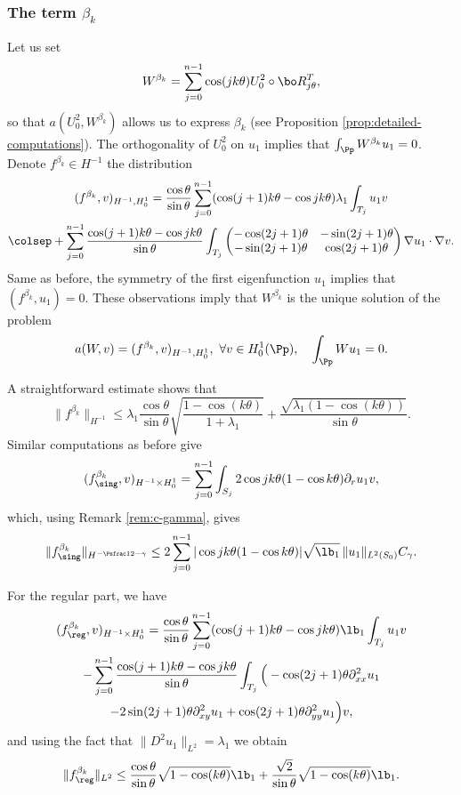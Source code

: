 \subsubsection*{The term $\beta_k$}
Let us set
\[
W^{\beta_k} = \sum_{j=0}^{n-1} \cos(jk\theta) U_0^2\circ \bo R_{j\theta}^T,
\]
so that $a(U_0^2,W^{\beta_k})$ allows us to express $\beta_k$ (see Proposition \ref{prop:detailed-computations}). The orthogonality of $U_0^2$ on $u_1$ implies that $\int_\Pp W^{\beta_k}u_1=0$. Denote $f^{\beta_k} \in H^{-1}$ the distribution
\vspace*{-5pt}
\begin{multline*}
(f^{\beta_k},v)_{H^{-1},H_0^1}
= \frac{\cos\theta}{\sin\theta}\sum_{j=0}^{n-1} (\cos(j+1)k\theta-\cos jk\theta) \lambda_1\int_{T_j} u_1 v\\\colsep
+ \sum_{j=0}^{n-1} \frac{\cos(j+1)k\theta-\cos jk\theta}{\sin \theta} \int_{T_j}\begin{pmatrix}
-\cos (2j+1)\theta & -\sin (2j+1) \theta \\
-\sin(2j+1)\theta & \cos (2j+1)\theta
\end{pmatrix}\nabla u_1 \cdot \nabla v.
\end{multline*}
Same as before, the symmetry of the first eigenfunction $u_1$ implies that $(f^{\beta_k},u_1) = 0$. These observations imply that $W^{\beta_k}$ is the unique solution of the problem
\[
a(W,v) = (f^{\beta_k},v)_{H^{-1},H_0^1},\ \forall v \in H_0^1(\Pp),\quad \int_\Pp Wu_1=0.
\]

A straightforward estimate shows that
\[
\|f^{\beta_k}\|_{H^{-1}} \leq \lambda_1\frac{\cos\theta}{\sin \theta} \sqrt{\frac{1-\cos(k\theta)}{1+\lambda_1}} +\frac{\sqrt{\lambda_1(1-\cos(k\theta))}}{\sin \theta}.
\]
Similar computations as before give
\[
(f_{\sing}^{\beta_k}, v)_{H^{-1}\times H^1_0} = \sum_{j=0}^{n-1}\int_{S_j} 2 \cos jk\theta(1-\cos k \theta) \partial_r u_1 v,
\]
which, using Remark \ref{rem:c-gamma}, gives
\[
\|f_{\sing}^{\beta_k}\|_{H^{-\Psfrac 12-\gamma}}\le 2\sum_{j=0}^{n-1} | \cos jk\theta(1-\cos k \theta)| \sqrt{\lb_1}\,\|u_1\|_{L^2(S_0)} C_\gamma.
\]

For the regular part, we have
\vspace*{-5pt}
\begin{multline*}(f_{\reg}^{\beta_k}, v)_{H^{-1}\times H^1_0}= \frac{\cos \theta}{\sin \theta}\sum_{j=0}^{n-1} (\cos (j+1)k\theta-\cos jk\theta) \lb_1 \int_{T_j} u_1v \\
- \sum_{j=0}^{n-1} \frac{\cos(j+1)k\theta-\cos jk\theta}{\sin \theta} \int_{T_j} \Big (-\cos (2j+1)\theta \partial^2_{xx}u_1 \\
-2 \sin (2j+1)\theta \partial^2_{xy} u_1+ \cos(2j+1)\theta \partial^2_{yy} u_1\Big)v,
\end{multline*}
and using the fact that $\|D^2 u_1\|_{L^2} = \lambda_1$ we obtain
\[
\|f_{\reg}^{\beta_k}\|_{L^2}\le \frac{\cos\theta}{\sin \theta}\sqrt{1-\cos (k \theta)} \lb_1 +\frac{\sqrt{2}}{\sin \theta} \sqrt{1- \cos (k \theta)}\lb_1 .
\]

